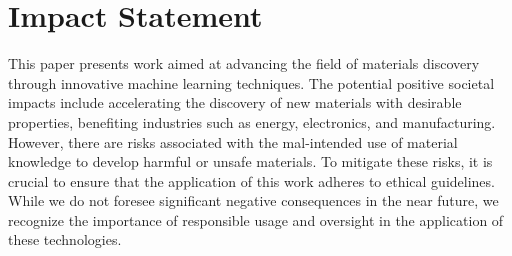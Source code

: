 \section*{Impact Statement}
This paper presents work aimed at advancing the field of materials discovery through innovative machine learning techniques. The potential positive societal impacts include accelerating the discovery of new materials with desirable properties, benefiting industries such as energy, electronics, and manufacturing. However, there are risks associated with the mal-intended use of material knowledge to develop harmful or unsafe materials. To mitigate these risks, it is crucial to ensure that the application of this work adheres to ethical guidelines. While we do not foresee significant negative consequences in the near future, we recognize the importance of responsible usage and oversight in the application of these technologies.